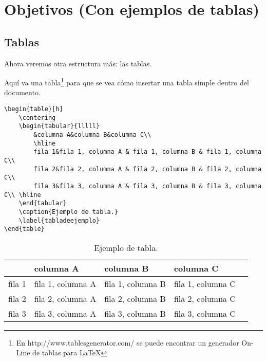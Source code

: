 
\chapter{Objetivos (Con ejemplos de tablas)}
\label{objetivos}

\section{Tablas}
Ahora veremos otra estructura más: las tablas.


Aquí va una tabla\footnote{En http://www.tablesgenerator.com/ se puede encontrar un generador On-Line de tablas para \LaTeX} para que se vea cómo insertar una tabla simple dentro del documento.

\begin{lstlisting}[style=Latex-color]
\begin{table}[h]
	\centering
	\begin{tabular}{lllll}
		&columna A&columna B&columna C\\
		\hline
		fila 1&fila 1, columna A & fila 1, columna B & fila 1, columna C\\
		fila 2&fila 2, columna A & fila 2, columna B & fila 2, columna C\\
		fila 3&fila 3, columna A & fila 3, columna B & fila 3, columna C\\ \hline
	\end{tabular}
	\caption{Ejemplo de tabla.}
	\label{tabladeejemplo}
\end{table}
\end{lstlisting}

\begin{table}[h]
	\centering
	\begin{tabular}{lllll}
		&columna A&columna B&columna C\\
		\hline
		fila 1&fila 1, columna A & fila 1, columna B & fila 1, columna C\\
		fila 2&fila 2, columna A & fila 2, columna B & fila 2, columna C\\
		fila 3&fila 3, columna A & fila 3, columna B & fila 3, columna C\\ \hline
	\end{tabular}
	\caption{Ejemplo de tabla.}
	\label{tabladeejemplo}
\end{table}

